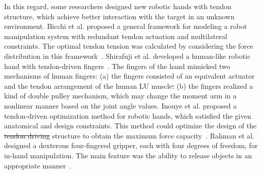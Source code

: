 \documentclass[journal,twoside,web]{ieeecolor}
\providecommand{\DIFadd}[1]{{\protect\color{blue}\uwave{#1}}} %
\providecommand{\DIFdel}[1]{{\protect\color{red}\sout{#1}}}                      %
\providecommand{\DIFaddbegin}{} %
\providecommand{\DIFaddend}{} %
\providecommand{\DIFdelbegin}{} %
\providecommand{\DIFdelend}{} %
\newcommand{\DIFscaledelfig}{0.5}
\newlength{\DIFdelgraphicswidth} %
\newlength{\DIFdelgraphicsheight} %
\newcommand{\DIFaddincludegraphics}[2][]{{\color{blue}\fbox{\DIFOincludegraphics[#1]{#2}}}} %
\newcommand{\DIFdelincludegraphics}[2][]{%
\sbox{\DIFdelgraphicsbox}{\DIFOincludegraphics[#1]{#2}}%
\settoboxwidth{\DIFdelgraphicswidth}{\DIFdelgraphicsbox} %
\settoboxtotalheight{\DIFdelgraphicsheight}{\DIFdelgraphicsbox} %
\scalebox{\DIFscaledelfig}{%
\parbox[b]{\DIFdelgraphicswidth}{\usebox{\DIFdelgraphicsbox}\\[-\baselineskip] \rule{\DIFdelgraphicswidth}{0em}}\llap{\resizebox{\DIFdelgraphicswidth}{\DIFdelgraphicsheight}{%
\setlength{\unitlength}{\DIFdelgraphicswidth}%
\begin{picture}(1,1)%
\thicklines\linethickness{2pt} %
{\color[rgb]{1,0,0}\put(0,0){\framebox(1,1){}}}%
{\color[rgb]{1,0,0}\put(0,0){\line( 1,1){1}}}%
{\color[rgb]{1,0,0}\put(0,1){\line(1,-1){1}}}%
\end{picture}%
}\hspace*{3pt}}} %
} %
\DeclareRobustCommand{\DIFaddbegin}{\DIFOaddbegin \let\includegraphics\DIFaddincludegraphics} %
\DeclareRobustCommand{\DIFaddend}{\DIFOaddend \let\includegraphics\DIFOincludegraphics} %
\DeclareRobustCommand{\DIFdelbegin}{\DIFOdelbegin \let\includegraphics\DIFdelincludegraphics} %
\DeclareRobustCommand{\DIFdelend}{\DIFOaddend \let\includegraphics\DIFOincludegraphics} %
\begin{document}
In this regard, some researchers designed new robotic hands with tendon structure, which achieve better interaction with the target in an unknown environment. 
Bicchi et al. proposed a general framework for modeling a robot manipulation system with redundant tendon actuation and multilateral constraints. The optimal tendon tension was calculated by considering the force distribution in this framework~\cite{Bicchi2000d}. 
Shirafuji et al. developed a human-like robotic hand with tendon-driven fingers~\cite{Shirafuji2014}. 
The fingers of the hand mimicked two mechanisms of human fingers: 
(a) the fingers consisted of an equivalent actuator and the tendon arrangement of the human LU muscle\DIFdelbegin \DIFdel{.
}\DIFdelend \DIFaddbegin \DIFadd{, and
}\DIFaddend (b) the fingers realized a kind of double pulley mechanism, which may change the moment arm in a nonlinear manner based on the joint angle values.
Inouye et al. proposed a tendon-driven optimization method for robotic hands, which satisfied the given anatomical and design constraints. This method could optimize the design of the \DIFdelbegin \DIFdel{tendon driving }\DIFdelend \DIFaddbegin \DIFadd{tendon-driven }\DIFaddend structure to obtain the maximum force capacity~\cite{Joshua2014}. 
Rahman et al. designed a dexterous four-fingered gripper, each with four degrees of freedom, for in-hand manipulation. The main feature was the ability to release objects in an appropriate manner~\cite{Rahman2016}.
\end{document}

